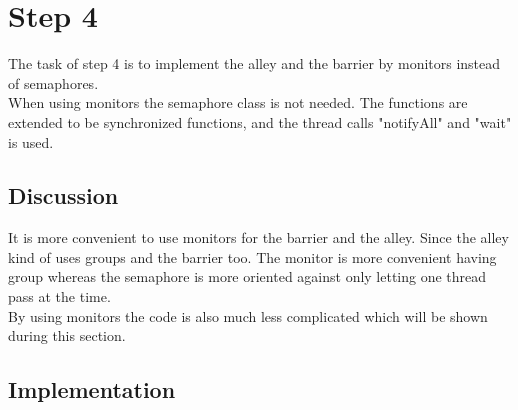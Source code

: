 \section{Step 4}
The task of step 4 is to implement the alley and the barrier by monitors instead of semaphores. \\
When using monitors the semaphore class is not needed. The functions are extended to be synchronized functions, and the thread calls "notifyAll" and "wait" is used.

\subsection{Discussion}
It is more convenient to use monitors for the barrier and the alley. Since the alley kind of uses groups and the barrier too. The monitor is more convenient having group whereas the semaphore is more oriented against only letting one thread pass at the time. \\
By using monitors the code is also much less complicated which will be shown during this section.


\subsection{Implementation}

